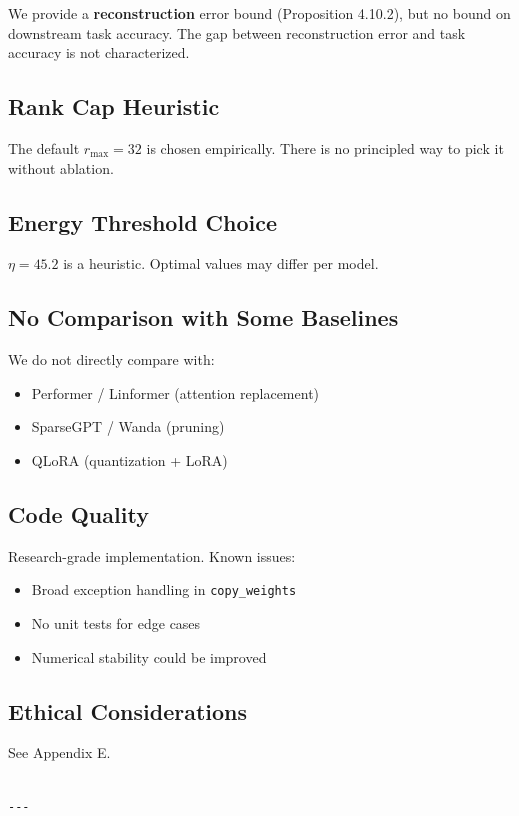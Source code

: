 We provide a \textbf{reconstruction} error bound (Proposition 4.10.2), but no 
bound on downstream task accuracy. The gap between reconstruction error and 
task accuracy is not characterized.

\subsection{Rank Cap Heuristic}

The default $r_\text{max} = 32$ is chosen empirically. There is no 
principled way to pick it without ablation.

\subsection{Energy Threshold Choice}

$\eta = 45.2$ is a heuristic. Optimal values may differ per model.

\subsection{No Comparison with Some Baselines}

We do not directly compare with:
\begin{itemize}
\item Performer / Linformer (attention replacement)
\item SparseGPT / Wanda (pruning)
\item QLoRA (quantization + LoRA)

\end{itemize}
\subsection{Code Quality}

Research-grade implementation. Known issues:
\begin{itemize}
\item Broad exception handling in \texttt{copy\_weights}
\item No unit tests for edge cases
\item Numerical stability could be improved

\end{itemize}
\subsection{Ethical Considerations}

See Appendix E.
\begin{lstlisting}

---
\end{lstlisting}